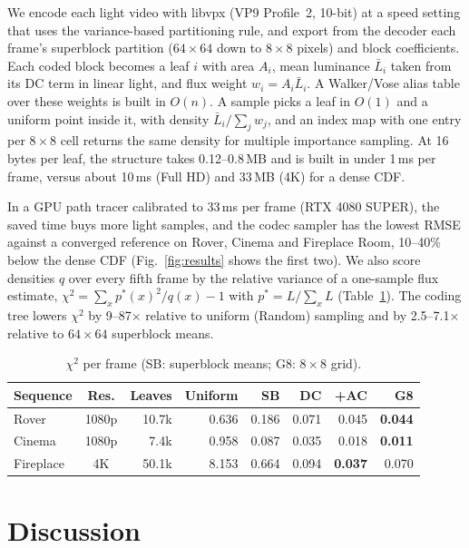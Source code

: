 \documentclass[sigconf]{acmart}
\begin{document}
We encode each light video with libvpx (VP9 Profile~2, 10-bit) at a speed setting that uses the
variance-based partitioning rule, and export from the decoder each frame's superblock partition
($64{\times}64$ down to $8{\times}8$ pixels) and block coefficients. Each coded block becomes a
leaf $i$ with area $A_i$, mean luminance $\bar L_i$ taken from its DC term in linear light, and
flux weight $w_i = A_i \bar L_i$. A Walker/Vose alias table over these weights is built in
$O(n)$. A sample picks a leaf in $O(1)$ and a uniform point inside it, with density
$\bar L_i/\sum_j w_j$, and an index map with one entry per $8{\times}8$ cell returns the same
density for multiple importance sampling. At 16 bytes per leaf, the structure takes
0.12--0.8\,MB and is built in under 1\,ms per frame, versus about 10\,ms (Full HD) and 33\,MB (4K)
for a dense CDF.

In a GPU path tracer calibrated to 33\,ms per frame (RTX 4080 SUPER), the
saved time buys more light samples, and the codec sampler has the lowest RMSE against a converged
reference on Rover, Cinema and Fireplace Room, 10--40\% below the dense CDF
(Fig.~\ref{fig:results} shows the first two). We also score densities $q$ over every fifth frame
by the relative variance of a one-sample flux estimate, $\chi^2 = \sum_x p^*(x)^2/q(x) - 1$ with
$p^* = L/\sum_x L$ (Table~\ref{tab:chi2}). The coding tree lowers $\chi^2$ by 9--87$\times$
relative to uniform (Random) sampling and by 2.5--7.1$\times$ relative to $64{\times}64$
superblock means.

\begin{table}[t]
\caption{$\chi^2$ per frame (SB: superblock means; G8: $8{\times}8$ grid).}
\label{tab:chi2}
\footnotesize
\setlength{\tabcolsep}{4pt}
\begin{tabular}{l c r r r r r r}
\toprule
Sequence & Res. & Leaves & Uniform & SB & DC & +AC & G8 \\
\midrule
Rover     & 1080p & 10.7k & 0.636 & 0.186 & 0.071 & 0.045 & \textbf{0.044} \\
Cinema    & 1080p & 7.4k  & 0.958 & 0.087 & 0.035 & 0.018 & \textbf{0.011} \\
Fireplace & 4K    & 50.1k & 8.153 & 0.664 & 0.094 & \textbf{0.037} & 0.070 \\
\bottomrule
\end{tabular}
\end{table}

\section{Discussion}
\end{document}
